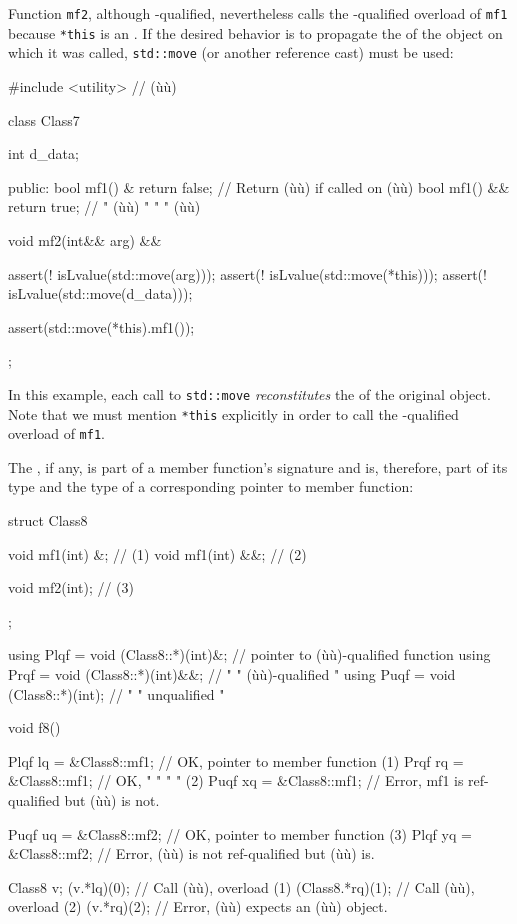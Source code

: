 \noindent Function \lstinline!mf2!, although -qualified, nevertheless
calls the -qualified overload of \lstinline!mf1! because
\lstinline!*this! is an . If the desired behavior is to
propagate the  of the object on which it was
called, \lstinline!std::move! (or another reference cast) must be used:

\begin{emcppslisting}[emcppsbatch=e2]
#include <utility>  // (ù{}ù)

class Class7
{
    int d_data;

public:
    bool mf1() &  { return false; }  // Return (ù{}ù) if called on (ù{}ù)
    bool mf1() && { return true; }   //    "   (ù{}ù)   "    "    " (ù{}ù)

    void mf2(int&& arg) &&
    {
        assert(! isLvalue(std::move(arg)));
        assert(! isLvalue(std::move(*this)));
        assert(! isLvalue(std::move(d_data)));

        assert(std::move(*this).mf1());
    }
};
\end{emcppslisting}
    

\noindent In this example, each call to \lstinline!std::move! \emph{reconstitutes}
the  of the original object. Note that we must
mention \lstinline!*this! explicitly in order to call the
-qualified overload of \lstinline!mf1!.

The , if any, is part of a member function's
signature and is, therefore, part of its type and the type of a
corresponding pointer to member function:

\begin{emcppslisting}[emcppsbatch=e2]
struct Class8
{
    void mf1(int) &;   // (1)
    void mf1(int) &&;  // (2)

    void mf2(int);     // (3)
};

using Plqf = void (Class8::*)(int)&;   // pointer to (ù{}ù)-qualified function
using Prqf = void (Class8::*)(int)&&;  //    "     " (ù{}ù)-qualified     "
using Puqf = void (Class8::*)(int);    //    "     " unqualified            "

void f8()
{
    Plqf lq = &Class8::mf1;  // OK, pointer to member function (1)
    Prqf rq = &Class8::mf1;  // OK,    "     "    "       "    (2)
    Puqf xq = &Class8::mf1;  // Error, mf1 is ref-qualified but (ù{}ù) is not.

    Puqf uq = &Class8::mf2;  // OK, pointer to member function (3)
    Plqf yq = &Class8::mf2;  // Error, (ù{}ù) is not ref-qualified but (ù{}ù) is.

    Class8 v;
    (v.*lq)(0);         // Call (ù{}ù), overload (1)
    (Class8{}.*rq)(1);  // Call (ù{}ù), overload (2)
    (v.*rq)(2);         // Error, (ù{}ù) expects an (ù{}ù) object.
}
\end{emcppslisting}
    

